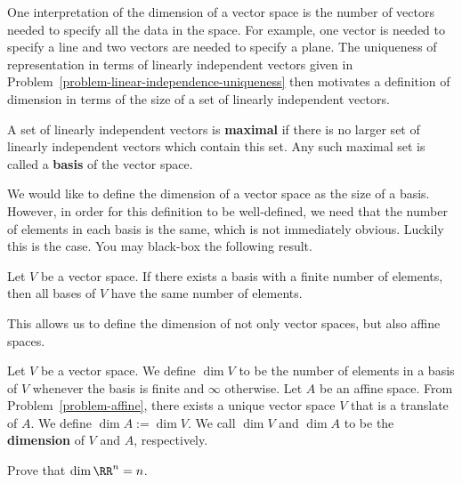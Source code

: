 \documentclass[11pt]{article}
\begin{document}
One interpretation of the dimension of a vector space is the number of vectors needed to specify all the data in the space. For example, one vector is needed to specify a line and two vectors are needed to specify a plane. The uniqueness of representation in terms of linearly independent vectors given in Problem~\ref{problem-linear-independence-uniqueness} then motivates a definition of dimension in terms of the size of a set of linearly independent vectors. 

\begin{defn} \label{definition-basis}
    A set of linearly independent vectors is \textbf{maximal} if there is no larger set of linearly independent vectors which contain this set. Any such maximal set is called a \textbf{basis} of the vector space. 
\end{defn}

We would like to define the dimension of a vector space as the size of a basis. However, in order for this definition to be well-defined, we need that the number of elements in each basis is the same, which is not immediately obvious. Luckily this is the case. You may black-box the following result. 

\begin{thm}
    Let $V$ be a vector space. If there exists a basis with a finite number of elements, then all bases of $V$ have the same number of elements. 
\end{thm}

This allows us to define the dimension of not only vector spaces, but also affine spaces. 

\begin{defn} 
    Let $V$ be a vector space. We define $\dim V$ to be the number of elements in a basis of $V$ whenever the basis is finite and $\infty$ otherwise. Let $A$ be an affine space. From Problem~\ref{problem-affine}, there exists a unique vector space $V$ that is a translate of $A$. We define $\dim A := \dim V$. We call $\dim V$ and $\dim A$ to be the \textbf{dimension} of $V$ and $A$, respectively. 
\end{defn}

\begin{prob} [5 points]
    Prove that $\dim \RR^n = n$. 
\end{prob}
\end{document}
